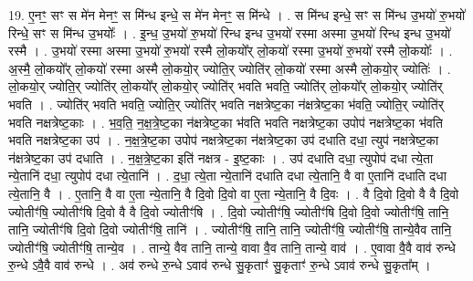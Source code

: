 \documentclass[17pt]{extarticle}
\begin{document}
19. ए॒नꣳ॒॒ सꣳ स मे॑न मेनꣳ॒॒ स मि॑न्ध इन्धे॒ स मे॑न मेनꣳ॒॒ स मि॑न्धे । . स मि॑न्ध इन्धे॒ सꣳ स मि॑न्ध उ॒भयो॑ रु॒भयो॑ रिन्धे॒ सꣳ स मि॑न्ध उ॒भयोः᳚ । . इ॒न्ध॒ उ॒भयो॑ रु॒भयो॑ रिन्ध इन्ध उ॒भयो॑ रस्मा अस्मा उ॒भयो॑ रिन्ध इन्ध उ॒भयो॑ रस्मै । . उ॒भयो॑ रस्मा अस्मा उ॒भयो॑ रु॒भयो॑ रस्मै लो॒कयो᳚र् लो॒कयो॑ रस्मा उ॒भयो॑ रु॒भयो॑ रस्मै लो॒कयोः᳚ । . अ॒स्मै॒ लो॒कयो᳚र् लो॒कयो॑ रस्मा अस्मै लो॒कयो॒र् ज्योति॒र् ज्योति॑र् लो॒कयो॑ रस्मा अस्मै लो॒कयो॒र् ज्योतिः॑ । . लो॒कयो॒र् ज्योति॒र् ज्योति॑र् लो॒कयो᳚र् लो॒कयो॒र् ज्योति॑र् भवति भवति॒ ज्योति॑र् लो॒कयो᳚र् लो॒कयो॒र् ज्योति॑र् भवति । . ज्योति॑र् भवति भवति॒ ज्योति॒र् ज्योति॑र् भवति नक्षत्रेष्ट॒का न॑क्षत्रेष्ट॒का भ॑वति॒ ज्योति॒र् ज्योति॑र् भवति नक्षत्रेष्ट॒काः । . भ॒व॒ति॒ न॒क्ष॒त्रे॒ष्ट॒का न॑क्षत्रेष्ट॒का भ॑वति भवति नक्षत्रेष्ट॒का उपोप॑ नक्षत्रेष्ट॒का भ॑वति भवति नक्षत्रेष्ट॒का उप॑ । . न॒क्ष॒त्रे॒ष्ट॒का उपोप॑ नक्षत्रेष्ट॒का न॑क्षत्रेष्ट॒का उप॑ दधाति दधा॒ त्युप॑ नक्षत्रेष्ट॒का न॑क्षत्रेष्ट॒का उप॑ दधाति । . न॒क्ष॒त्रे॒ष्ट॒का इति॑ नक्षत्र - इ॒ष्ट॒काः । . उप॑ दधाति दधा॒ त्युपोप॑ दधा त्ये॒ता न्ये॒तानि॑ दधा॒ त्युपोप॑ दधा त्ये॒तानि॑ । . द॒धा॒ त्ये॒ता न्ये॒तानि॑ दधाति दधा त्ये॒तानि॒ वै वा ए॒तानि॑ दधाति दधा त्ये॒तानि॒ वै । . ए॒तानि॒ वै वा ए॒ता न्ये॒तानि॒ वै दि॒वो दि॒वो वा ए॒ता न्ये॒तानि॒ वै दि॒वः । . वै दि॒वो दि॒वो वै वै दि॒वो ज्योतीꣳ॑षि॒ ज्योतीꣳ॑षि दि॒वो वै वै दि॒वो ज्योतीꣳ॑षि । . दि॒वो ज्योतीꣳ॑षि॒ ज्योतीꣳ॑षि दि॒वो दि॒वो ज्योतीꣳ॑षि॒ तानि॒ तानि॒ ज्योतीꣳ॑षि दि॒वो दि॒वो ज्योतीꣳ॑षि॒ तानि॑ । . ज्योतीꣳ॑षि॒ तानि॒ तानि॒ ज्योतीꣳ॑षि॒ ज्योतीꣳ॑षि॒ तान्ये॒वैव तानि॒ ज्योतीꣳ॑षि॒ ज्योतीꣳ॑षि॒ तान्ये॒व । . तान्ये॒ वैव तानि॒ तान्ये॒ वावा वै॒व तानि॒ तान्ये॒ वाव॑ । . ए॒वावा वै॒वै वाव॑ रुन्धे रु॒न्धे ऽवै॒वै वाव॑ रुन्धे । . अव॑ रुन्धे रु॒न्धे ऽवाव॑ रुन्धे सु॒कृताꣳ॑ सु॒कृताꣳ॑ रु॒न्धे ऽवाव॑ रुन्धे सु॒कृता᳚म् । \newline
\end{document}
